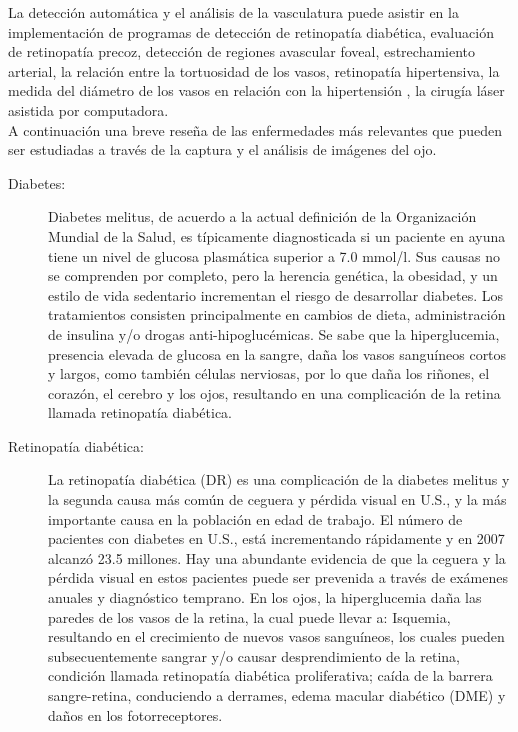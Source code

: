 La detección automática y el análisis de la vasculatura   puede asistir en la implementación de programas de detección de retinopatía diabética, evaluación de retinopatía precoz, detección de regiones avascular foveal, estrechamiento arterial, la relación entre la tortuosidad de los vasos, retinopatía hipertensiva, la medida del diámetro de los vasos en relación con la hipertensión , la cirugía láser asistida por computadora.\cite{fraz2012blood}\\

A continuación una breve reseña de las enfermedades más relevantes que pueden ser estudiadas a través de la captura y el análisis de imágenes del ojo.

\begin{description}
    \item[Diabetes:] Diabetes melitus, de acuerdo a la actual definición de la Organización Mundial de la Salud, es típicamente diagnosticada si un paciente en ayuna tiene un nivel de glucosa plasmática superior a 7.0 mmol/l. Sus causas no se comprenden por completo, pero la herencia genética, la obesidad, y un estilo de vida sedentario incrementan el riesgo de desarrollar diabetes. Los tratamientos consisten principalmente en cambios de dieta, administración de insulina y/o drogas anti-hipoglucémicas. Se sabe que la hiperglucemia, presencia elevada de glucosa en la sangre, daña los vasos sanguíneos cortos y largos, como también células nerviosas, por lo que daña los riñones, el corazón, el cerebro y los ojos, resultando en una complicación de la retina llamada retinopatía diabética.
    \item[Retinopatía diabética:] La retinopatía diabética (DR) es una complicación de la diabetes melitus y la segunda causa más común de ceguera y pérdida visual en U.S., y la más importante causa en la población en edad de trabajo. El número de pacientes con diabetes en U.S., está incrementando rápidamente y en 2007 alcanzó 23.5 millones. Hay una abundante evidencia de que la ceguera y la pérdida visual en estos pacientes puede ser prevenida a través de exámenes anuales y  diagnóstico temprano. En los ojos, la hiperglucemia daña las paredes de los vasos de la retina, la cual puede llevar a:
Isquemia, resultando en el crecimiento de nuevos vasos sanguíneos, los cuales pueden subsecuentemente sangrar y/o causar desprendimiento de la retina, condición llamada retinopatía diabética proliferativa;
caída de la barrera sangre-retina, conduciendo a derrames, edema macular diabético (DME) y daños en los fotorreceptores.

\end{description}
